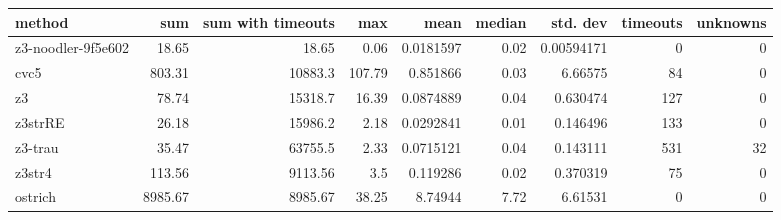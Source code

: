\begin{tabular}{lrrrrrrrr}
\hline
 method             &     sum &   sum with timeouts &    max &      mean &   median &   std. dev &   timeouts &   unknowns \\
\hline
 z3-noodler-9f5e602 &   18.65 &               18.65 &   0.06 & 0.0181597 &     0.02 & 0.00594171 &          0 &          0 \\
 cvc5               &  803.31 &            10883.3  & 107.79 & 0.851866  &     0.03 & 6.66575    &         84 &          0 \\
 z3                 &   78.74 &            15318.7  &  16.39 & 0.0874889 &     0.04 & 0.630474   &        127 &          0 \\
 z3strRE            &   26.18 &            15986.2  &   2.18 & 0.0292841 &     0.01 & 0.146496   &        133 &          0 \\
 z3-trau            &   35.47 &            63755.5  &   2.33 & 0.0715121 &     0.04 & 0.143111   &        531 &         32 \\
 z3str4             &  113.56 &             9113.56 &   3.5  & 0.119286  &     0.02 & 0.370319   &         75 &          0 \\
 ostrich            & 8985.67 &             8985.67 &  38.25 & 8.74944   &     7.72 & 6.61531    &          0 &          0 \\
\hline
\end{tabular}
